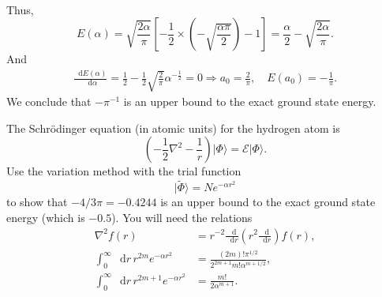 \documentclass[a4paper]{book}
\newcounter{exercise}[chapter]
\newcounter{solution}[chapter]
\newcommand*{\dif}{\mathop{}\!\mathrm{d}}
\begin{document}
\begin{solution}
\begin{align*}
	\end{align*}
	Thus,
	\[
		E( \alpha ) = \sqrt{ \frac{ 2\alpha }{ \pi } } \left[ -\frac{1}{2} \times \left( - \sqrt{ \frac{ \alpha \pi }{ 2 } } \right) - 1 \right] = \frac{ \alpha }{2} - \sqrt{ \frac{ 2\alpha }{ \pi } } .
	\]
	And
	\begin{align*}
		\frac{ \dif E( \alpha ) }{ \dif \alpha } = \frac{1}{2} -  \frac{1}{2} \sqrt{ \frac{2}{\pi} } \alpha^{-\frac{1}{2}} = 0 \Rightarrow a_0 = \frac{ 2 }{ \pi } , \quad E( a_0 ) = - \frac{1}{\pi} .
	\end{align*}
	We conclude that $-\pi^{-1}$ is an upper bound to the exact ground state energy.
	
	\end{solution}
	
	\begin{exercise}
	The Schr{\"o}dinger equation (in atomic units) for the hydrogen atom is
	\[
		\left( -\frac{1}{2}\nabla^2 - \frac{1}{r} \right) |\Phi\rangle = \mathscr{E} | \Phi \rangle .
	\]
	Use the variation method with the trial function
	\[
		|\tilde{\Phi}\rangle = N e^{-\alpha r^2}
	\]
	to show that $-4/3\pi=-0.4244$ is an upper bound to the exact ground state energy (which is $-0.5$). You will need the relations
	\begin{align*}
		\nabla^2 f(r) &= r^{-2} \frac{\dif }{\dif r}\left( r^2 \frac{\dif}{\dif r}\right) f(r) , \\
		\int_0^\infty \dif r \, r^{2m} e^{-\alpha r^2} &= \frac{ (2m)! \pi^{1/2} }{ 2^{2m+1} m! \alpha^{m+1/2} } , \\
		\int_0^\infty \dif r \, r^{2m+1} e^{-\alpha r^2} &= \frac{ m! }{ 2 \alpha^{m+1} } .
	\end{align*}		
	\end{exercise}
	
\end{document}
